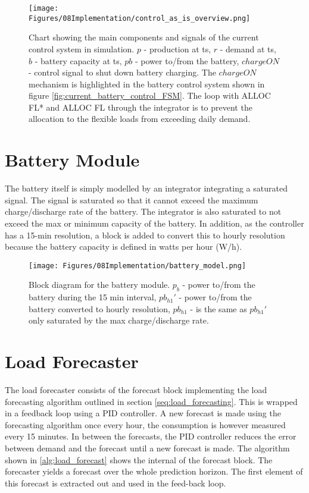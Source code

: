 \begin{figure}
    \centering
    \texttt{[image: Figures/08Implementation/control\_as\_is\_overview.png]}
    \caption[Current control system block chart]{Chart showing the main components and signals of the current control system in simulation. $p$ - production at ts, $r$ - demand at ts, $b$ - battery capacity at ts, $pb$ - power to/from the battery, $chargeON$ - control signal to shut down battery charging. The $chargeON$ mechanism is highlighted in the battery control system shown in figure \ref{fig:current_battery_control_FSM}. The loop with ALLOC FL* and ALLOC FL through the integrator is to prevent the allocation to the flexible loads from exceeding daily demand.}
    \label{fig:control_as_is_overview}
\end{figure}


\section{Battery Module}
The battery itself is simply modelled by an integrator integrating a saturated signal. The signal is saturated so that it cannot exceed the maximum charge/discharge rate of the battery. The integrator is also saturated to not exceed the max or minimum capacity of the battery. In addition, as the controller has a 15-min resolution, a block is added to convert this to hourly resolution because the battery capacity is defined in watts per hour (W/h).

\begin{figure}
    \centering
    \texttt{[image: Figures/08Implementation/battery\_model.png]}
    \caption[Battery module block diagram]{Block diagram for the battery module. $p_b$ - power to/from the battery during the 15 min interval, $pb_{h1}'$ - power to/from the battery converted to hourly resolution, $pb_{h1}$ - is the same as $pb_{h1}'$ only saturated by the max charge/discharge rate.}
    \label{fig:battery_block}
\end{figure}

\section{Load Forecaster}

The load forecaster consists of the forecast block implementing the load forecasting algorithm outlined in section \ref{seq:load_forecasting}. This is wrapped in a feedback loop using a PID controller. A new forecast is made using the forecasting algorithm once every hour, the consumption is however measured every 15 minutes. In between the forecasts, the PID controller reduces the error between demand and the forecast until a new forecast is made. The algorithm shown in \ref{alg:load_forecast} shows the internal of the forecast block. The forecaster yields a forecast over the whole prediction horizon. The first element of this forecast is extracted out and used in the feed-back loop.

